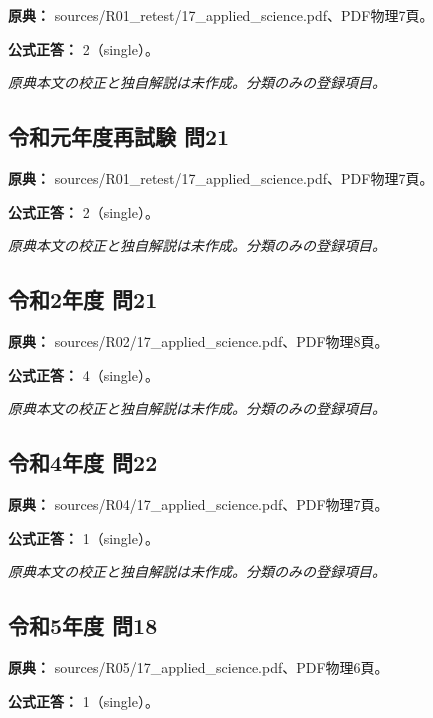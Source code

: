 \noindent\textbf{原典：} sources/R01\_retest/17\_applied\_science.pdf、PDF物理7頁。

\textbf{公式正答：} 2（single）。

\par\textit{原典本文の校正と独自解説は未作成。分類のみの登録項目。}

\subsection{令和元年度再試験 問21}
\label{q:r01-ret-applied-21}

\noindent\textbf{原典：} sources/R01\_retest/17\_applied\_science.pdf、PDF物理7頁。

\textbf{公式正答：} 2（single）。

\par\textit{原典本文の校正と独自解説は未作成。分類のみの登録項目。}

\subsection{令和2年度 問21}
\label{q:r02-reg-applied-21}

\noindent\textbf{原典：} sources/R02/17\_applied\_science.pdf、PDF物理8頁。

\textbf{公式正答：} 4（single）。

\par\textit{原典本文の校正と独自解説は未作成。分類のみの登録項目。}

\subsection{令和4年度 問22}
\label{q:r04-reg-applied-22}

\noindent\textbf{原典：} sources/R04/17\_applied\_science.pdf、PDF物理7頁。

\textbf{公式正答：} 1（single）。

\par\textit{原典本文の校正と独自解説は未作成。分類のみの登録項目。}

\subsection{令和5年度 問18}
\label{q:r05-reg-applied-18}

\noindent\textbf{原典：} sources/R05/17\_applied\_science.pdf、PDF物理6頁。

\textbf{公式正答：} 1（single）。

